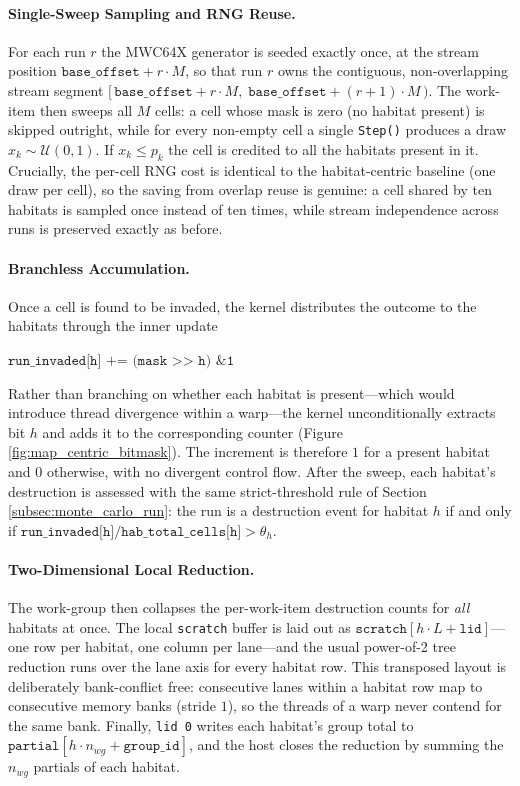 \paragraph{Single-Sweep Sampling and RNG Reuse.}
For each run $r$ the MWC64X generator is seeded exactly once, at the stream position $\texttt{base\_offset} + r \cdot M$, so that run $r$ owns the contiguous, non-overlapping stream segment $[\,\texttt{base\_offset} + r\cdot M,\; \texttt{base\_offset} + (r+1)\cdot M\,)$. The work-item then sweeps all $M$ cells: a cell whose mask is zero (no habitat present) is skipped outright, while for every non-empty cell a single \texttt{Step()} produces a draw $x_k \sim \mathcal{U}(0,1)$. If $x_k \leq p_k$ the cell is credited to all the habitats present in it. Crucially, the per-cell RNG cost is identical to the habitat-centric baseline (one draw per cell), so the saving from overlap reuse is genuine: a cell shared by ten habitats is sampled once instead of ten times, while stream independence across runs is preserved exactly as before.

\paragraph{Branchless Accumulation.}
Once a cell is found to be invaded, the kernel distributes the outcome to the habitats through the inner update 
\begin{center}
$\texttt{run\_invaded[h] += (mask >> h) \& 1}$
\end{center}
Rather than branching on whether each habitat is present---which would introduce thread divergence within a warp---the kernel unconditionally extracts bit $h$ and adds it to the corresponding counter (Figure \ref{fig:map_centric_bitmask}). The increment is therefore $1$ for a present habitat and $0$ otherwise, with no divergent control flow. After the sweep, each habitat's destruction is assessed with the same strict-threshold rule of Section \ref{subsec:monte_carlo_run}: the run is a destruction event for habitat $h$ if and only if $\texttt{run\_invaded[h]} / \texttt{hab\_total\_cells[h]} > \theta_h$.

\paragraph{Two-Dimensional Local Reduction.}
The work-group then collapses the per-work-item destruction counts for \emph{all} habitats at once. The local \texttt{scratch} buffer is laid out as $\texttt{scratch}[h \cdot L + \texttt{lid}]$---one row per habitat, one column per lane---and the usual power-of-2 tree reduction runs over the lane axis for every habitat row. This transposed layout is deliberately bank-conflict free: consecutive lanes within a habitat row map to consecutive memory banks (stride $1$), so the threads of a warp never contend for the same bank. Finally, \texttt{lid 0} writes each habitat's group total to $\texttt{partial}[h \cdot n_{wg} + \texttt{group\_id}]$, and the host closes the reduction by summing the $n_{wg}$ partials of each habitat.

